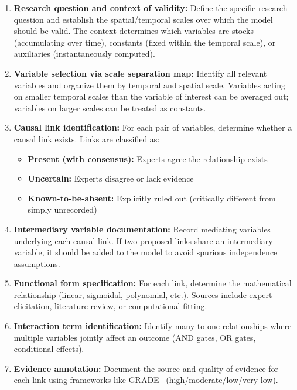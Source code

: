 \documentclass[12pt]{article}
\begin{document}
\begin{enumerate}
    \item \textbf{Research question and context of validity:} Define the specific research question and establish the spatial/temporal scales over which the model should be valid. The context determines which variables are stocks (accumulating over time), constants (fixed within the temporal scale), or auxiliaries (instantaneously computed).
    
    \item \textbf{Variable selection via scale separation map:} Identify all relevant variables and organize them by temporal and spatial scale. Variables acting on smaller temporal scales than the variable of interest can be averaged out; variables on larger scales can be treated as constants.
    
    \item \textbf{Causal link identification:} For each pair of variables, determine whether a causal link exists. Links are classified as:
    \begin{itemize}
        \item \textbf{Present (with consensus):} Experts agree the relationship exists
        \item \textbf{Uncertain:} Experts disagree or lack evidence
        \item \textbf{Known-to-be-absent:} Explicitly ruled out (critically different from simply unrecorded)
    \end{itemize}
    
    \item \textbf{Intermediary variable documentation:} Record mediating variables underlying each causal link. If two proposed links share an intermediary variable, it should be added to the model to avoid spurious independence assumptions.
    
    \item \textbf{Functional form specification:} For each link, determine the mathematical relationship (linear, sigmoidal, polynomial, etc.). Sources include expert elicitation, literature review, or computational fitting.
    
    \item \textbf{Interaction term identification:} Identify many-to-one relationships where multiple variables jointly affect an outcome (AND gates, OR gates, conditional effects).
    
    \item \textbf{Evidence annotation:} Document the source and quality of evidence for each link using frameworks like GRADE~\citep{moberg2018grade} (high/moderate/low/very low).
\end{enumerate}
\end{document}
